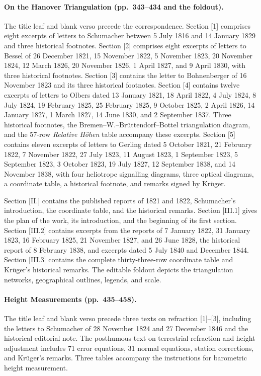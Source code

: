 \paragraph{On the Hanover Triangulation (pp.~343--434 and the foldout).}
The title leaf and blank verso precede the correspondence. Section [1] comprises eight excerpts of letters to Schumacher between 5 July 1816 and 14 January 1829 and three historical footnotes. Section [2] comprises eight excerpts of letters to Bessel of 26 December 1821, 15 November 1822, 5 November 1823, 20 November 1824, 12 March 1826, 20 November 1826, 1 April 1827, and 9 April 1830, with three historical footnotes. Section [3] contains the letter to Bohnenberger of 16 November 1823 and its three historical footnotes. Section [4] contains twelve excerpts of letters to Olbers dated 13 January 1821, 18 April 1822, 4 July 1824, 8 July 1824, 19 February 1825, 25 February 1825, 9 October 1825, 2 April 1826, 14 January 1827, 1 March 1827, 14 June 1830, and 2 September 1837. Three historical footnotes, the Bremen--W.--Brüttendorf--Bottel triangulation diagram, and the 57-row \textit{Relative Höhen} table accompany these excerpts. Section [5] contains eleven excerpts of letters to Gerling dated 5 October 1821, 21 February 1822, 7 November 1822, 27 July 1823, 11 August 1823, 1 September 1823, 5 September 1823, 3 October 1823, 19 July 1827, 12 September 1838, and 14 November 1838, with four heliotrope signalling diagrams, three optical diagrams, a coordinate table, a historical footnote, and remarks signed by Krüger.

Section [II.] contains the published reports of 1821 and 1822, Schumacher's introduction, the coordinate table, and the historical remarks. Section [III.1] gives the plan of the work, its introduction, and the beginning of its first section. Section [III.2] contains excerpts from the reports of 7 January 1822, 31 January 1823, 16 February 1825, 21 November 1827, and 26 June 1828, the historical report of 8 February 1838, and excerpts dated 5 July 1840 and December 1844. Section [III.3] contains the complete thirty-three-row coordinate table and Krüger's historical remarks. The editable foldout depicts the triangulation networks, geographical outlines, legends, and scale.

\paragraph{Height Measurements (pp.~435--458).}
The title leaf and blank verso precede three texts on refraction [1]--[3], including the letters to Schumacher of 28 November 1824 and 27 December 1846 and the historical editorial note. The posthumous text on terrestrial refraction and height adjustment includes 71 error equations, 31 normal equations, station corrections, and Krüger's remarks. Three tables accompany the instructions for barometric height measurement.

